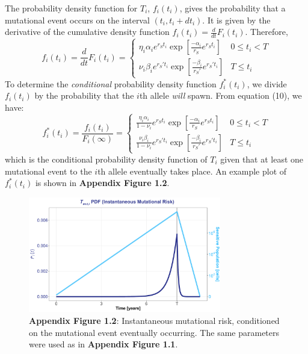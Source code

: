 \documentclass{article}
\begin{document}
The probability density function for $T_i$, $f_i(t_i)$, gives the probability that a mutational event occurs on the interval $(t_i,t_i+dt_i)$.  It is given by the derivative of the cumulative density function $f_i(t_i) = \frac{d}{dt}F_i(t_i)$.  Therefore,  
\begin{equation}
f_i(t_i)=\frac{d}{dt}F_i(t_i)=  \begin{cases}
		\eta_i \alpha_i e^{r_S t_i} \exp[\frac{-\alpha_i}{r_S} e^{r_S t_i}] & 0 \leq t_i < T \\
		\nu_i \beta_i e^{r_S' t_i} \exp[\frac{-\beta_i}{r_S'} e^{r_S' t_i}] & T \leq t_i
       \end{cases}
\end{equation}
To determine the \textit{conditional} probability density function $f_i^*(t_i)$, we divide $f_i(t_i)$ by the probability that the $i$th allele \textit{will} spawn.  From equation (10), we have:
\begin{equation}
f_i^*(t_i) = \frac{f_i(t_i)}{F_i(\infty)}=\begin{cases}
		\frac{\eta_i \alpha_i}{1-\nu_i} e^{r_S t_i} \exp[\frac{-\alpha_i}{r_S} e^{r_S t_i}] & 0 \leq t_i < T \\
		\frac{\nu_i \beta_i}{1-\nu_i} e^{r_S' t_i} \exp[\frac{-\beta_i}{r_S'} e^{r_S' t_i}] & T \leq t_i
       \end{cases}
\end{equation}
which is the conditional probability density function of $T_{i}$ given that at least one mutational event to the $i$th allele eventually takes place.  An example plot of $f_i^*(t_{i})$ is shown in \textbf{Appendix Figure 1.2}.

\begin{figure}
\includegraphics[width=0.75\textwidth]{InstMutRisk}
\centering
\\
\textbf{Appendix Figure 1.2}: Instantaneous mutational risk, conditioned on the mutational event eventually occurring.  The same parameters were used as in \textbf{Appendix Figure 1.1}.
\end{figure}
\FloatBarrier
\end{document}
